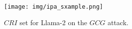 \begin{figure}[!htb]
    \centering
    \texttt{[image: img/ipa\_sxample.png]}
    \caption{$CRI$ set for Llama-2 on the $GCG$ attack.
}
    \label{fig:multi-prompts-gcg}
\end{figure}





